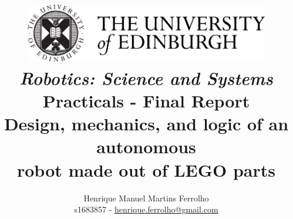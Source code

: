 \title{
    \includegraphics[width=0.8\textwidth]{res/university-of-edinburgh-logo.png}\\
    \bigskip\bigskip
    \bigskip\bigskip
    \bigskip\bigskip
    \huge{\textbf{\textit{Robotics: Science and Systems}}}\\
    \bigskip\bigskip
    \large\textbf{Practicals - Final Report}\\
    \bigskip\bigskip
    \bigskip\bigskip
    \Large\textbf{
        Design, mechanics, and logic of an autonomous\\
        robot made out of LEGO parts
    }\\
    \bigskip\bigskip
    \bigskip\bigskip
    \bigskip\bigskip
    \bigskip\bigskip
    \bigskip\bigskip
}

\author{
    Henrique Manuel Martins Ferrolho\\
    s1683857 - \href{mailto:henrique.ferrolho@gmail.com}{henrique.ferrolho@gmail.com}
    \bigskip
}

\maketitle
\thispagestyle{empty}

\newpage
